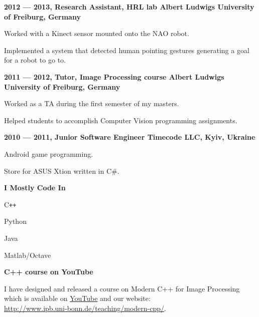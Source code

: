 \documentclass[a4paper,12pt,final]{memoir}
\newcommand{\Sep}{\vspace{1.5em}}
\newcommand{\SmallSep}{\vspace{0.5em}}
\newcommand{\CVSection}[1]
	{\Large\textbf{#1}\par
	\SmallSep\normalsize\normalfont}
\newcommand{\CVItem}[1]
	{\textbf{\color{MidnightBlue} #1}}
\begin{document}
\CVItem{2012 --- 2013, Research Assistant, HRL lab
\newline Albert Ludwigs University of Freiburg, Germany}
\begin{compactitem}[\color{RoyalBlue}$\circ$]
	\item Worked with a Kinect sensor mounted onto the NAO robot.
	\item Implemented a system that detected human pointing gestures generating a
	goal for a robot to go to.
\end{compactitem}
\SmallSep

\CVItem{2011 --- 2012, Tutor, Image Processing course
\newline Albert Ludwigs University of Freiburg, Germany}
\begin{compactitem}[\color{RoyalBlue}$\circ$]
\item Worked as a TA during the first semester of my masters.
\item Helped students to accomplish Computer Vision programming assignments.
\end{compactitem}
\SmallSep

\CVItem{2010 --- 2011, Junior Software Engineer
\newline Timecode LLC, Kyiv, Ukraine}
\begin{compactitem}[\color{RoyalBlue}$\circ$]
\item Android game programming.
\item Store for ASUS Xtion written in C\#.
\end{compactitem}

\SmallSep
\framebreak
\clearpage
\framebreak{}
	\SmallSep{}
	\vspace{-2mm}

	\CVSection{I Mostly Code In}
	\begin{compactitem}[\color{MidnightBlue}$\circ$]
		\item C\texttt{++}
		\item Python
		\item Java
		\item Matlab/Octave
	\end{compactitem}
	\Sep{}

	\CVSection{C++ course on YouTube}
	I have designed and released a course on Modern C++ for Image Processing which
	is available on
	\href{https://www.youtube.com/playlist?list=PLgnQpQtFTOGR50iIOtO36nK6aNPtVq98C&disable_polymer=true}{YouTube}
	and our website: \\ \tiny\url{http://www.ipb.uni-bonn.de/teaching/modern-cpp/}.
	\Sep{}
\end{document}
